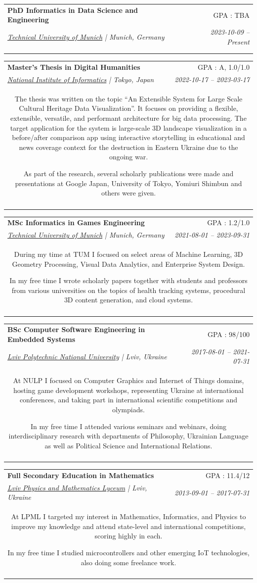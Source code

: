 \documentclass[letterpaper,10pt]{article}
\makeatletter
\newcommand{\resumeSubheading}[5]{
  \item
    \begin{tabular*}{0.97\textwidth}[t]{l@{\extracolsep{\fill}}r}
      \textbf{#1} & #2 \\
      \textit{#3} & \textit{#4} \\
      \multicolumn{2}{c}{\parbox{\linewidth}{#5}} \\\vspace{-2pt}
    \end{tabular*}\vspace{-8pt}
}
\makeatother
\begin{document}
    \resumeSubheading
      {PhD Informatics in Data Science and Engineering}{GPA : TBA}
      {\href{https://db.cit.tum.de/}{{Technical University of Munich}} | Munich, Germany}{2023-10-09 -- Present} 
      {}
		
    \resumeSubheading
      {Master's Thesis in Digital Humanities}{GPA : A, 1.0/1.0}
      {\href{https://www.nii.ac.jp/}{{National Institute of Informatics}} | Tokyo, Japan}{2022-10-17 -- 2023-03-17} 
      {The thesis was written on the topic “An Extensible System for Large Scale Cultural Heritage Data Visualization”. It focuses on providing a flexible, extensible, versatile, and performant architecture for big data processing. The target application for the system is large-scale 3D landscape visualization in a before/after comparison app using interactive storytelling in educational and news coverage context for the destruction in Eastern Ukraine due to the ongoing war.

As part of the research, several scholarly publications were made and presentations at Google Japan, University of Tokyo, Yomiuri Shimbun and others were given.}
		
    \resumeSubheading
      {MSc Informatics in Games Engineering}{GPA : 1.2/1.0}
      {\href{https://www.tum.de/}{{Technical University of Munich}} | Munich, Germany}{2021-08-01 -- 2023-09-31} 
      {During my time at TUM I focused on select areas of Machine Learning, 3D Geometry Processing, Visual Data Analytics, and Enterprise System Design.

In my free time I wrote scholarly papers together with students and professors from various universities on the topics of health tracking systems, procedural 3D content generation, and cloud systems.}
		
    \resumeSubheading
      {BSc Computer Software Engineering in Embedded Systems}{GPA : 98/100}
      {\href{https://lpnu.ua/}{{Lviv Polytechnic National University}} | Lviv, Ukraine}{2017-08-01 -- 2021-07-31} 
      {At NULP I focused on Computer Graphics and Internet of Things domains, hosting game development workshops, representing Ukraine at international conferences, and taking part in international scientific competitions and olympiads.

In my free time I attended various seminars and webinars, doing interdisciplinary research with departments of Philosophy, Ukrainian Language as well as Political Science and International Relations.}
		
    \resumeSubheading
      {Full Secondary Education in Mathematics}{GPA : 11.4/12}
      {\href{https://www.lpml.com.ua/}{{Lviv Physics and Mathematics Lyceum}} | Lviv, Ukraine}{2013-09-01 -- 2017-07-31} 
      {At LPML I targeted my interest in Mathematics, Informatics, and Physics to improve my knowledge and attend state-level and international competitions, scoring highly in each.

In my free time I studied microcontrollers and other emerging IoT technologies, also doing some freelance work.}
		
\end{document}
